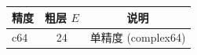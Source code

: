 \begin{tabular}{l c c}
\hline
精度 & 粗层 $E$ & 说明 \\
\hline
c64 & 24 & 单精度 (complex64) \\
\hline
\end{tabular}
